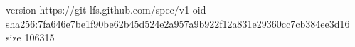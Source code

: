 version https://git-lfs.github.com/spec/v1
oid sha256:7fa646e7be1f90be62b45d524e2a957a9b922f12a831e29360cc7cb384ee3d16
size 106315
